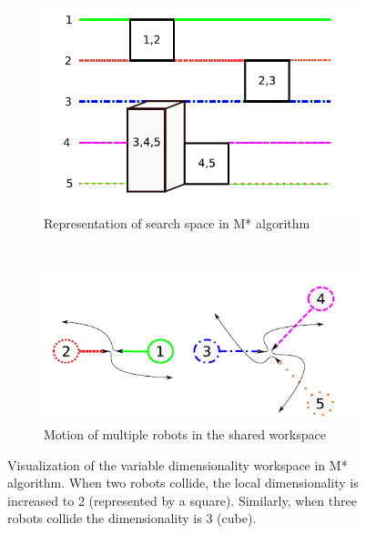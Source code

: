 \begin{figure}
    \centering
    \begin{subfigure}[b]{0.4\textwidth}
        \includegraphics[width=\textwidth]{./images/m_star_a.png}
        \caption{Representation of search space in M* algorithm}
        \label{fig:mstara}
    \end{subfigure}
    ~ %
    \begin{subfigure}[b]{0.55\textwidth}
        \includegraphics[width=\textwidth]{./images/m_star_b.png}
        \caption{Motion of multiple robots in the shared workspace}
        \label{fig:mstarb}
    \end{subfigure}
    \caption[Visualization of the variable dimensionality workspace in M* algorithm.]{Visualization of the variable dimensionality workspace in M* algorithm. When two robots collide, the local dimensionality is increased to 2 (represented by a square). Similarly, when three robots collide the dimensionality is 3 (cube). \cite{wagner2011m} }\label{fig:mstar}
\end{figure}

